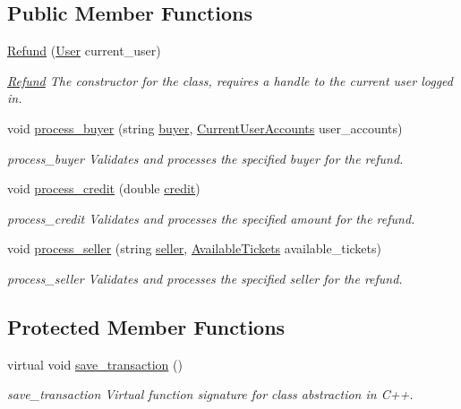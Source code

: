 \subsection*{Public Member Functions}
\begin{DoxyCompactItemize}
\item 
\hyperlink{class_refund_a0eb505b9541ed2a73cdbe5b56555394e}{Refund} (\hyperlink{class_user}{User} current\-\_\-user)
\begin{DoxyCompactList}\small\item\em \hyperlink{class_refund}{Refund} The constructor for the class, requires a handle to the current user logged in. \end{DoxyCompactList}\item 
void \hyperlink{class_refund_a90ef039ccc4d01ff299ddaef920da75c}{process\-\_\-buyer} (string \hyperlink{class_refund_a6b1f8b7205b4bb4f3dfa0cba13c39bac}{buyer}, \hyperlink{class_current_user_accounts}{Current\-User\-Accounts} user\-\_\-accounts)
\begin{DoxyCompactList}\small\item\em process\-\_\-buyer Validates and processes the specified buyer for the refund. \end{DoxyCompactList}\item 
void \hyperlink{class_refund_a38a5999e3af1e44149e75f399e2f0846}{process\-\_\-credit} (double \hyperlink{class_refund_aa559c3686bb9d38c3335c16bbea07be8}{credit})
\begin{DoxyCompactList}\small\item\em process\-\_\-credit Validates and processes the specified amount for the refund. \end{DoxyCompactList}\item 
void \hyperlink{class_refund_a49057e08f942f1fbabcdae180a9ab134}{process\-\_\-seller} (string \hyperlink{class_refund_a8cdc0977faad029fbb45ab09035319b9}{seller}, \hyperlink{class_available_tickets}{Available\-Tickets} available\-\_\-tickets)
\begin{DoxyCompactList}\small\item\em process\-\_\-seller Validates and processes the specified seller for the refund. \end{DoxyCompactList}\end{DoxyCompactItemize}
\subsection*{Protected Member Functions}
\begin{DoxyCompactItemize}
\item 
virtual void \hyperlink{class_refund_a8e5996ad33eb07eef44f55deba6c298e}{save\-\_\-transaction} ()
\begin{DoxyCompactList}\small\item\em save\-\_\-transaction Virtual function signature for class abstraction in C++. \end{DoxyCompactList}\end{DoxyCompactItemize}
